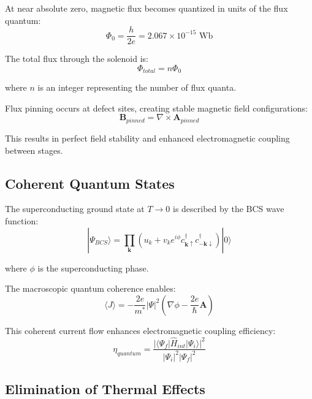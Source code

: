 \documentclass[12pt,a4paper]{article}
\begin{document}
At near absolute zero, magnetic flux becomes quantized in units of the flux quantum:
\begin{equation}
\Phi_0 = \frac{h}{2e} = 2.067 \times 10^{-15} \text{ Wb}
\end{equation}

The total flux through the solenoid is:
\begin{equation}
\Phi_{total} = n \Phi_0
\end{equation}

where $n$ is an integer representing the number of flux quanta.

Flux pinning occurs at defect sites, creating stable magnetic field configurations:
\begin{equation}
\mathbf{B}_{pinned} = \nabla \times \mathbf{A}_{pinned}
\end{equation}

This results in perfect field stability and enhanced electromagnetic coupling between stages.

\subsection{Coherent Quantum States}

The superconducting ground state at $T \rightarrow 0$ is described by the BCS wave function:
\begin{equation}
|\Psi_{BCS}\rangle = \prod_{\mathbf{k}} (u_k + v_k e^{i\phi} c_{\mathbf{k}\uparrow}^{\dagger} c_{-\mathbf{k}\downarrow}^{\dagger}) |0\rangle
\end{equation}

where $\phi$ is the superconducting phase.

The macroscopic quantum coherence enables:
\begin{equation}
\langle J \rangle = -\frac{2e}{m^*} |\Psi|^2 (\nabla \phi - \frac{2e}{\hbar} \mathbf{A})
\end{equation}

This coherent current flow enhances electromagnetic coupling efficiency:
\begin{equation}
\eta_{quantum} = \frac{|\langle \Psi_{f}|\hat{H}_{int}|\Psi_i \rangle|^2}{|\Psi_i|^2 |\Psi_f|^2}
\end{equation}

\subsection{Elimination of Thermal Effects}
\end{document}
